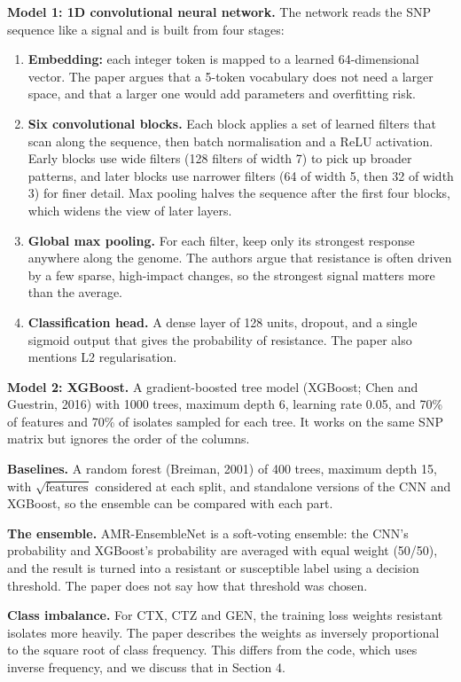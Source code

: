 \documentclass[11pt]{article}
\begin{document}
\textbf{Model 1: 1D convolutional neural network.} The network reads the SNP sequence like a signal and is built from four stages:
\begin{enumerate}[nosep]
    \item \textbf{Embedding:} each integer token is mapped to a learned 64-dimensional vector. The paper argues that a 5-token vocabulary does not need a larger space, and that a larger one would add parameters and overfitting risk.
    \item \textbf{Six convolutional blocks.} Each block applies a set of learned filters that scan along the sequence, then batch normalisation and a ReLU activation. Early blocks use wide filters (128 filters of width 7) to pick up broader patterns, and later blocks use narrower filters (64 of width 5, then 32 of width 3) for finer detail. Max pooling halves the sequence after the first four blocks, which widens the view of later layers.
    \item \textbf{Global max pooling.} For each filter, keep only its strongest response anywhere along the genome. The authors argue that resistance is often driven by a few sparse, high-impact changes, so the strongest signal matters more than the average.
    \item \textbf{Classification head.} A dense layer of 128 units, dropout, and a single sigmoid output that gives the probability of resistance. The paper also mentions L2 regularisation.
\end{enumerate}

\textbf{Model 2: XGBoost.} A gradient-boosted tree model (XGBoost; Chen and Guestrin, 2016) with 1000 trees, maximum depth 6, learning rate 0.05, and 70\% of features and 70\% of isolates sampled for each tree. It works on the same SNP matrix but ignores the order of the columns.

\textbf{Baselines.} A random forest (Breiman, 2001) of 400 trees, maximum depth 15, with $\sqrt{\text{features}}$ considered at each split, and standalone versions of the CNN and XGBoost, so the ensemble can be compared with each part.

\textbf{The ensemble.} AMR-EnsembleNet is a soft-voting ensemble: the CNN's probability and XGBoost's probability are averaged with equal weight (50/50), and the result is turned into a resistant or susceptible label using a decision threshold. The paper does not say how that threshold was chosen.

\textbf{Class imbalance.} For CTX, CTZ and GEN, the training loss weights resistant isolates more heavily. The paper describes the weights as inversely proportional to the square root of class frequency. This differs from the code, which uses inverse frequency, and we discuss that in Section 4.
\end{document}

